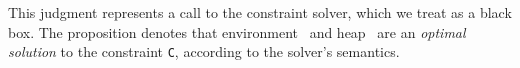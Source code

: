 











This judgment represents a call to the constraint solver, which we
treat as a black box.  The proposition \mbox{\solveH{\Euid}{\Huid}{\C}}
denotes that environment \Euid~and heap \Huid~are an \emph{optimal solution}
to the constraint \texttt{C}, according to the solver's semantics.

